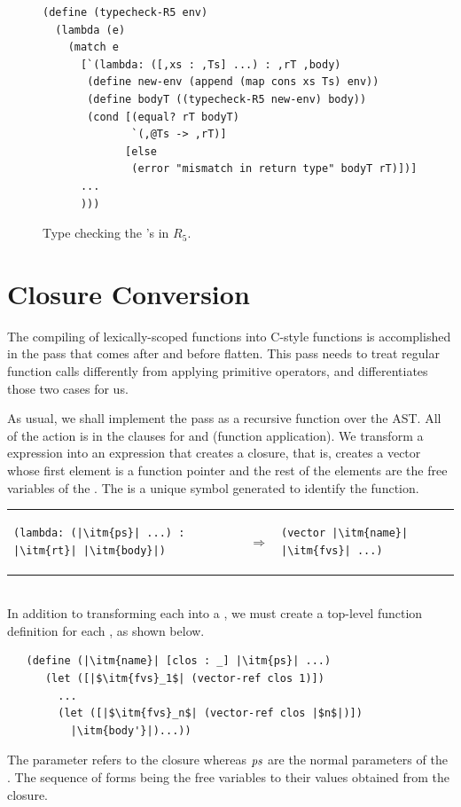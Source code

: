 \documentclass[11pt]{book}
\begin{document}
\begin{figure}[tbp]
\begin{lstlisting}
(define (typecheck-R5 env)
  (lambda (e)
    (match e
      [`(lambda: ([,xs : ,Ts] ...) : ,rT ,body)
       (define new-env (append (map cons xs Ts) env))
       (define bodyT ((typecheck-R5 new-env) body))
       (cond [(equal? rT bodyT)
              `(,@Ts -> ,rT)]
             [else
              (error "mismatch in return type" bodyT rT)])]
      ...
      )))
\end{lstlisting}
\caption{Type checking the 's in $R_5$.}
\label{fig:typecheck-R5}
\end{figure}


\section{Closure Conversion}

The compiling of lexically-scoped functions into C-style functions is
accomplished in the pass  that comes after
 and before flatten. This pass needs to treat
regular function calls differently from applying primitive operators,
and  differentiates those two cases for us.

As usual, we shall implement the pass as a recursive function over the
AST. All of the action is in the clauses for  and
 (function application). We transform a 
expression into an expression that creates a closure, that is, creates
a vector whose first element is a function pointer and the rest of the
elements are the free variables of the .  The 
is a unique symbol generated to identify the function.

\begin{tabular}{lll}
\begin{minipage}{0.4\textwidth}
\begin{lstlisting}
(lambda: (|\itm{ps}| ...) : |\itm{rt}| |\itm{body}|)
\end{lstlisting}
\end{minipage}
&
$\Rightarrow$
&
\begin{minipage}{0.4\textwidth}
\begin{lstlisting}
(vector |\itm{name}| |\itm{fvs}| ...)
\end{lstlisting}
\end{minipage}
\end{tabular}  \\
%
In addition to transforming each  into a , we
must create a top-level function definition for each , as
shown below.
\begin{lstlisting}
   (define (|\itm{name}| [clos : _] |\itm{ps}| ...)
      (let ([|$\itm{fvs}_1$| (vector-ref clos 1)])
        ...
        (let ([|$\itm{fvs}_n$| (vector-ref clos |$n$|)])
          |\itm{body'}|)...))
\end{lstlisting}
The  parameter refers to the closure whereas $\mathit{ps}$ are
the normal parameters of the . The sequence of 
forms being the free variables to their values obtained from the
closure.
\end{document}
